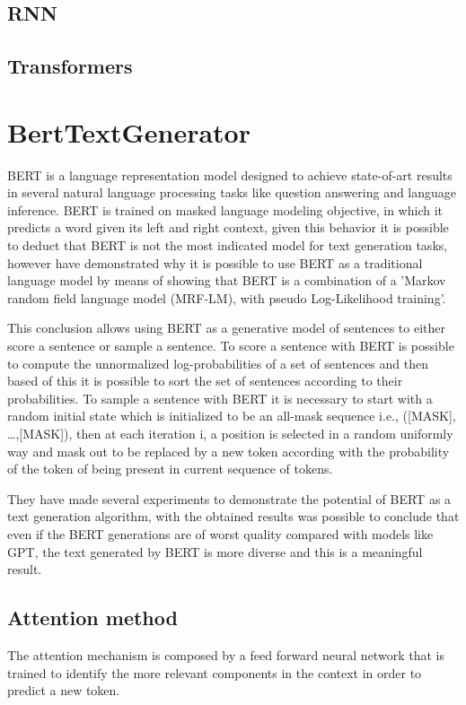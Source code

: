 \documentclass[10pt,twocolumn,letterpaper]{article}
\begin{document}
\subsection{RNN}

\subsection{Transformers}


\section{BertTextGenerator}
BERT is a language representation model designed to achieve state-of-art results
in several natural language processing tasks like question answering and language inference.
BERT is trained on masked language modeling objective, in which it predicts a word given its
left and right context, given this behavior it is possible to deduct that BERT is not the most
indicated model for text generation tasks, however have demonstrated why
it is possible to use BERT as a traditional language model by means of showing that BERT is a
combination of a 'Markov random field language model (MRF-LM), with pseudo Log-Likelihood training'. \cite{Wang2019BERTHA}

This conclusion allows using BERT as a generative model of sentences to either score a sentence or
sample a sentence.
To score a sentence with BERT is possible to compute the unnormalized log-probabilities of a set of
sentences and then based of this it is possible to sort the set of sentences according to their probabilities.
To sample a sentence with BERT it is necessary to start with a random initial state which is initialized to be
an all-mask sequence i.e., ([MASK], …,[MASK]), then at each iteration i, a position is selected in a random uniformly
way and mask out to be replaced by a new token according with the probability of the token of being present in current
sequence of tokens.

They have made several experiments to demonstrate the potential of BERT as a text generation algorithm,
with the obtained results was possible to conclude that even if the BERT generations are of worst quality
compared with models like GPT, the text generated by BERT is more diverse and this is a meaningful result.


\subsection{Attention method}
The attention mechanism is composed by a feed forward neural network that is trained to
identify the more relevant components in the context in order to predict a new token.
\end{document}
